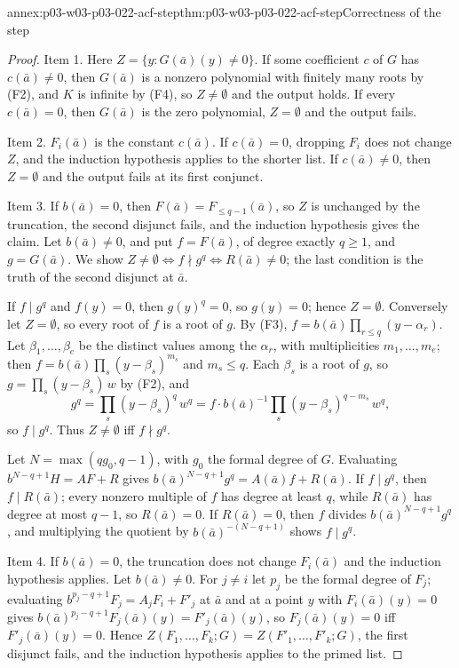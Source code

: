 \begin{annexitem}{annex:p03-w03-p03-022-acf-step}{thm:p03-w03-p03-022-acf-step}{Correctness of the step}
\begin{proof}
Item 1. Here \(Z=\{y:G(\bar a)(y)\ne0\}\). If some coefficient \(c\) of
\(G\) has \(c(\bar a)\ne0\), then \(G(\bar a)\) is a nonzero polynomial with
finitely many roots by (F2), and \(K\) is infinite by (F4), so
\(Z\ne\emptyset\) and the output holds. If every \(c(\bar a)=0\), then
\(G(\bar a)\) is the zero polynomial, \(Z=\emptyset\) and the output fails.

Item 2. \(F_i(\bar a)\) is the constant \(c(\bar a)\). If
\(c(\bar a)=0\), dropping \(F_i\) does not change \(Z\), and the induction
hypothesis applies to the shorter list. If \(c(\bar a)\ne0\), then
\(Z=\emptyset\) and the output fails at its first conjunct.

Item 3. If \(b(\bar a)=0\), then \(F(\bar a)=F_{\le q-1}(\bar a)\), so \(Z\)
is unchanged by the truncation, the second disjunct fails, and the
induction hypothesis gives the claim. Let \(b(\bar a)\ne0\), and put
\(f=F(\bar a)\), of degree exactly \(q\ge1\), and \(g=G(\bar a)\). We show
\(Z\ne\emptyset\iff f\nmid g^q\iff R(\bar a)\ne0\); the last condition is
the truth of the second disjunct at \(\bar a\).

If \(f\mid g^q\) and \(f(y)=0\), then \(g(y)^q=0\), so \(g(y)=0\); hence
\(Z=\emptyset\). Conversely let \(Z=\emptyset\), so every root of \(f\) is a
root of \(g\). By (F3), \(f=b(\bar a)\prod_{r\le q}(y-\alpha_r)\). Let
\(\beta_1,\ldots,\beta_e\) be the distinct values among the \(\alpha_r\),
with multiplicities \(m_1,\ldots,m_e\); then
\(f=b(\bar a)\prod_s(y-\beta_s)^{m_s}\) and \(m_s\le q\). Each \(\beta_s\) is a
root of \(g\), so \(g=\prod_s(y-\beta_s)\,w\) by (F2), and
\[
g^q=\prod_s(y-\beta_s)^q\,w^q
=f\cdot b(\bar a)^{-1}\prod_s(y-\beta_s)^{q-m_s}\,w^q ,
\]
so \(f\mid g^q\). Thus \(Z\ne\emptyset\) iff \(f\nmid g^q\).

Let \(N=\max(qg_0,q-1)\), with \(g_0\) the formal degree of \(G\). Evaluating
\(b^{N-q+1}H=AF+R\) gives \(b(\bar a)^{N-q+1}g^q=A(\bar a)f+R(\bar a)\). If
\(f\mid g^q\), then \(f\mid R(\bar a)\); every nonzero multiple of \(f\) has
degree at least \(q\), while \(R(\bar a)\) has degree at most \(q-1\), so
\(R(\bar a)=0\). If \(R(\bar a)=0\), then \(f\) divides
\(b(\bar a)^{N-q+1}g^q\), and multiplying the quotient by
\(b(\bar a)^{-(N-q+1)}\) shows \(f\mid g^q\).

Item 4. If \(b(\bar a)=0\), the truncation does not change \(F_i(\bar a)\)
and the induction hypothesis applies. Let \(b(\bar a)\ne0\). For \(j\ne i\)
let \(p_j\) be the formal degree of \(F_j\); evaluating
\(b^{p_j-q+1}F_j=A_jF_i+F'_j\) at \(\bar a\) and at a point \(y\) with
\(F_i(\bar a)(y)=0\) gives
\(b(\bar a)^{p_j-q+1}F_j(\bar a)(y)=F'_j(\bar a)(y)\), so
\(F_j(\bar a)(y)=0\) iff \(F'_j(\bar a)(y)=0\). Hence
\(Z(F_1,\ldots,F_k;G)=Z(F'_1,\ldots,F'_k;G)\), the first disjunct fails,
and the induction hypothesis applies to the primed list.


\end{proof}
\end{annexitem}
